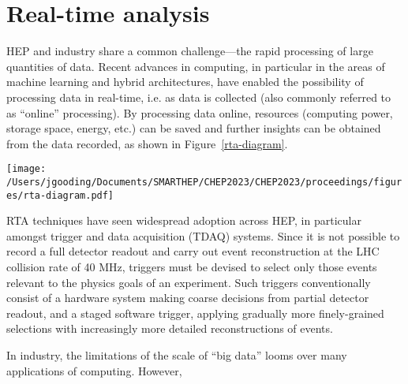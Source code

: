 \section{Real-time analysis}
\label{rta}
HEP and industry share a common challenge—the rapid processing of large quantities of data. \cite{hu-big-data} Recent advances in computing, in particular in the areas of machine learning and hybrid architectures, have enabled the possibility of processing data in real-time, i.e. as data is collected (also commonly referred to as ``online'' processing). \cite{real-time-computing} By processing data online, resources (computing power, storage space, energy, etc.) can be saved and further insights can be obtained from the data recorded, as shown in Figure~\ref{rta-diagram}. \par

\begin{figure*}[h!]
    \centering
    \texttt{[image: /Users/jgooding/Documents/SMARTHEP/CHEP2023/CHEP2023/proceedings/figures/rta-diagram.pdf]}
    \caption{Traditional and RTA approaches to data processing. Traditional approaches rely on recording all data and processing this offilne; in RTA, data is processed as it is produced, recording only the relevant portions, enabling greater volumes of processed data to be stored.}
    \label{rta-diagram}       %
\end{figure*}

RTA techniques have seen widespread adoption across HEP, in particular amongst trigger and data acquisition (TDAQ) systems. Since it is not possible to record a full detector readout and carry out event reconstruction at the LHC collision rate of {40}{ MHz}, triggers must be devised to select only those events relevant to the physics goals of an experiment. Such triggers conventionally consist of a hardware system making coarse decisions from partial detector readout, and a staged software trigger, applying gradually more finely-grained selections with increasingly more detailed reconstructions of events.\par

In industry, the limitations of the scale of ``big data'' looms over many applications of computing. However, \par


